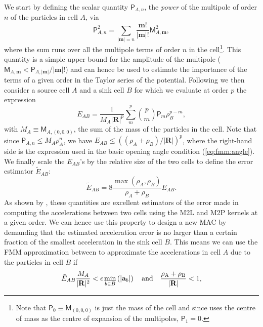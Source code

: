 We start by defining the scalar quantity $\mathsf{P}_{A,n}$, the
\emph{power} of the multipole of order $n$ of the particles in cell $A$,
via
\begin{equation}
  \mathsf{P}_{A,n}^2 = \sum_{|\mathbf{m}|=n} \frac{\mathbf{m}!}{|\mathbf{m}|!}\mathsf{M}_{A,\mathbf{m}}^2,
\end{equation}
where the sum runs over all the multipole terms of order $n$ in the
cell\footnote{Note that $\mathsf{P}_{0} \equiv \mathsf{M}_{(0,0,0)}$ is
  just the mass of the cell and since \swift uses the centre of mass as the
  centre of expansion of the multipoles, $\mathsf{P}_{1} = 0$.}. This
quantity is a simple upper bound for the amplitude of the multipole
($\mathsf{M}_{A, \mathbf{m}} < \mathsf{P}_{A,|\mathbf{m}|}/|\mathbf{m}|!$)
and can hence be used to estimate the importance of the terms of a given
order in the Taylor series of the potential. Following \cite{Dehnen2014} we
then consider a source cell $A$ and a sink cell $B$ for which we evaluate
at order $p$ the expression
\begin{equation}
  E_{AB} = \frac{1}{M_A|\mathbf{R}|^p} \sum_m^p \binom{p}{m} \mathsf{P}_m
  \rho_B^{p-m},
  \label{eq:fmm:e_ab}
\end{equation}
with $M_A \equiv \mathsf{M}_{A,(0,0,0)}$, the sum of the mass of the
particles in the cell. Note that since $\mathsf{P}_{A,n} \leq M_A
\rho_A^n$, we have $E_{AB} \leq \left((\rho_A +
\rho_B)/|\mathbf{R}|\right)^p$, where the right-hand side is the expression
used in the basic opening angle condition (\ref{eq:fmm:angle}). We finally
scale the $E_{AB}$'s by the relative size of the two cells to define the
error estimator $\tilde{E}_{AB}$:
\begin{equation}
  \tilde{E}_{AB} = 8\frac{\max(\rho_A, \rho_B)}{\rho_A + \rho_B}E_{AB}.
  \label{eq:fmm:e_ab_tilde}
\end{equation}
As shown by \cite{Dehnen2014}, these quantities are excellent estimators of
the error made in computing the accelerations between two cells using the
M2L and M2P kernels at a given order. We can hence use this property to
design a new MAC by demanding that the estimated acceleration error is no
larger than a certain fraction of the smallest acceleration in the sink
cell $B$. This means we can use the FMM approximation between to
approximate the accelerations in cell $A$ due to the particles in cell $B$ if
\begin{equation}
  \tilde{E}_{AB} \frac{M_A}{|\mathbf{R}|^2} < \epsilon \min_{b\in
    B}\left(|\mathbf{a}_b|\right) \quad \rm{and} \quad \frac{\rho_A +
    \rho_B} {|\mathbf{R}|} < 1,
  \label{eq:fmm:mac}  
\end{equation}
